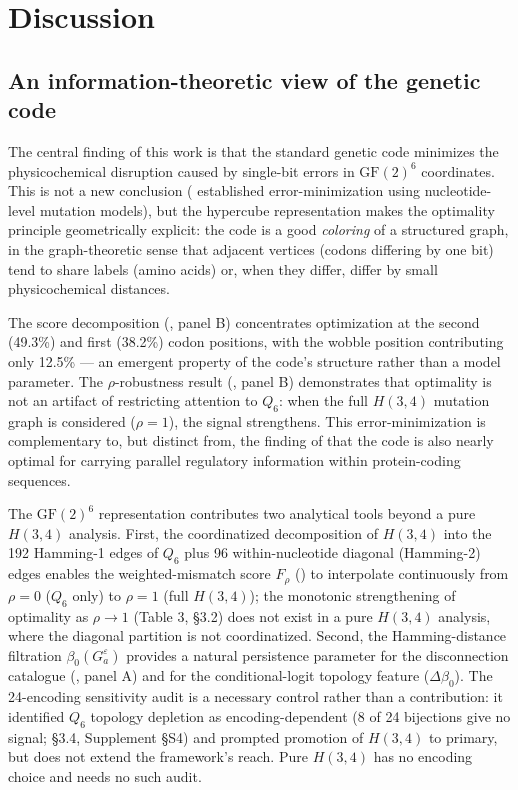 \documentclass[preprint,11pt,authoryear,a4paper]{elsarticle}
\begin{document}
\section{Discussion}\label{sec:discussion}

\subsection{An information-theoretic view of the genetic
code}\label{sec:disc-info}

The central finding of this work is that the standard genetic code
minimizes the physicochemical disruption caused by single-bit errors in
\({\text{GF}(2)}^{6}\) coordinates. This is not a new conclusion
(\citep{freeland1998} established error-minimization using
nucleotide-level mutation models), but the hypercube representation
makes the optimality principle geometrically explicit: the code is a
good \emph{coloring} of a structured graph, in the graph-theoretic sense
that adjacent vertices (codons differing by one bit) tend to share
labels (amino acids) or, when they differ, differ by small
physicochemical distances.

The score decomposition (, panel B)
concentrates optimization at the second (49.3\%) and first (38.2\%)
codon positions, with the wobble position contributing only 12.5\% ---
an emergent property of the code's structure rather than a model
parameter. The \(\rho\)-robustness result (, panel
B) demonstrates that optimality is not an artifact of restricting
attention to \(Q_{6}\): when the full \(H(3,4)\) mutation graph is
considered (\(\rho = 1\)), the signal strengthens. This
error-minimization is complementary to, but distinct from, the finding
of \citep{itzkovitz2007} that the code is also nearly optimal for
carrying parallel regulatory information within protein-coding
sequences.

The \({\text{GF}(2)}^{6}\) representation contributes two analytical
tools beyond a pure \(H(3,4)\) analysis. First, the coordinatized
decomposition of \(H(3,4)\) into the 192 Hamming-1 edges of \(Q_{6}\)
plus 96 within-nucleotide diagonal (Hamming-2) edges enables the
weighted-mismatch score \(F_{\rho}\) () to
interpolate continuously from \(\rho = 0\) (\(Q_{6}\) only) to
\(\rho = 1\) (full \(H(3,4)\)); the monotonic strengthening of
optimality as \(\rho \rightarrow 1\) (Table 3, §3.2) does not exist in a
pure \(H(3,4)\) analysis, where the diagonal partition is not
coordinatized. Second, the Hamming-distance filtration
\(\beta_{0}\left( G_{a}^{\varepsilon} \right)\) provides a natural
persistence parameter for the disconnection catalogue
(, panel A) and for the conditional-logit topology
feature (\(\Delta\beta_{0}\)). The 24-encoding sensitivity audit is a
necessary control rather than a contribution: it identified \(Q_{6}\)
topology depletion as encoding-dependent (8 of 24 bijections give no
signal; §3.4, Supplement §S4) and prompted promotion of \(H(3,4)\) to
primary, but does not extend the framework's reach. Pure \(H(3,4)\) has
no encoding choice and needs no such audit.
\end{document}
